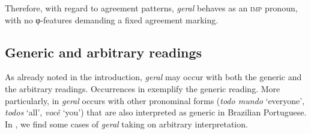 \documentclass[output=paper]{langscibook}
\begin{document}
{Therefore, with regard to agreement patterns,} \textit{geral} {behaves as an \textsc{imp} pronoun, with no φ-fea\-tures demanding a fixed agreement marking.}



\subsection{Generic and arbitrary readings}\label{sec:avelar:4.2}

{As already noted in the introduction,} \textit{geral} {may occur with both the generic and the arbitrary readings. Occurrences in  exemplify the generic reading. More particularly, in } \textit{geral} {occurs with other pronominal forms (}{\textit{todo mundo}} {‘everyone’,} {\textit{todos}} {‘all’,} {\textit{você}} {‘you’) that are also interpreted as generic in Brazilian Portuguese. In , we find some cases of} \textit{geral} {taking on arbitrary interpretation.}
\end{document}
